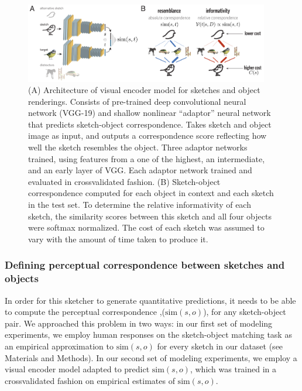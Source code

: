 \documentclass[9pt,twocolumn,twoside]{pnas-new}
\begin{document}
\begin{figure}[htbp]
\centering
\includegraphics[width=0.95\textwidth]{figures/4_model_schematic.pdf}
\caption{(A) Architecture of visual encoder model for sketches and object renderings. Consists of pre-trained deep convolutional neural network (VGG-19) and shallow nonlinear ``adaptor'' neural network that predicts sketch-object correspondence. 
Takes sketch and object image as input, and outputs a correspondence score reflecting how well the sketch resembles the object. 
Three adaptor networks trained, using features from a one of the highest, an intermediate, and an early layer of VGG.
Each adaptor network trained and evaluated in crossvalidated fashion. 
(B) Sketch-object correspondence computed for each object in context and each sketch in the test set. 
To determine the relative informativity of each sketch, the similarity scores between this sketch and all four objects were softmax normalized. 
The cost of each sketch was assumed to vary with the amount of time taken to produce it.}
\label{model_schematic}
\end{figure}

\subsubsection*{Defining perceptual correspondence between sketches and objects}

In order for this sketcher to generate quantitative predictions, it needs to be able to compute the perceptual correspondence ,($\textrm{sim}(s,o)$), for any sketch-object pair. 
We approached this problem in two ways: in our first set of modeling experiments, we employ human responses on the sketch-object matching task as an empirical approximation to $\textrm{sim}(s,o)$ for every sketch in our dataset (see Materials and Methods). 
In our second set of modeling experiments, we employ a visual encoder model adapted to predict $\textrm{sim}(s,o)$, which was trained in a crossvalidated fashion on empirical estimates of $\textrm{sim}(s,o)$.
\end{document}

